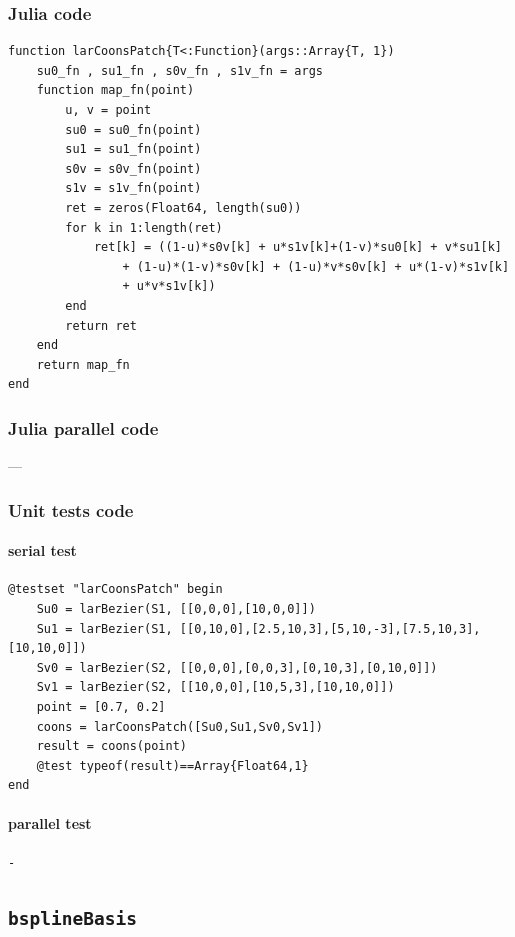 \documentclass[a4paper,11pt]{article}
\begin{document}
\subsubsection{Julia code}

\begin{verbatim}
function larCoonsPatch{T<:Function}(args::Array{T, 1})
    su0_fn , su1_fn , s0v_fn , s1v_fn = args
    function map_fn(point)
        u, v = point
        su0 = su0_fn(point)
        su1 = su1_fn(point)
        s0v = s0v_fn(point)
        s1v = s1v_fn(point)
        ret = zeros(Float64, length(su0))  
        for k in 1:length(ret)
            ret[k] = ((1-u)*s0v[k] + u*s1v[k]+(1-v)*su0[k] + v*su1[k] 
                + (1-u)*(1-v)*s0v[k] + (1-u)*v*s0v[k] + u*(1-v)*s1v[k] 
                + u*v*s1v[k])
        end
        return ret
    end
    return map_fn
end
\end{verbatim}

\subsubsection{Julia parallel code}
---

\subsubsection{Unit tests code}

\paragraph{serial test}
\begin{verbatim}
@testset "larCoonsPatch" begin
    Su0 = larBezier(S1, [[0,0,0],[10,0,0]])
    Su1 = larBezier(S1, [[0,10,0],[2.5,10,3],[5,10,-3],[7.5,10,3],[10,10,0]])
    Sv0 = larBezier(S2, [[0,0,0],[0,0,3],[0,10,3],[0,10,0]])
    Sv1 = larBezier(S2, [[10,0,0],[10,5,3],[10,10,0]])
    point = [0.7, 0.2]
    coons = larCoonsPatch([Su0,Su1,Sv0,Sv1])
    result = coons(point)
    @test typeof(result)==Array{Float64,1}
end
\end{verbatim}

\paragraph{parallel test}
\begin{verbatim}
-
\end{verbatim}


\subsection{\texttt{bsplineBasis}}
\end{document}
